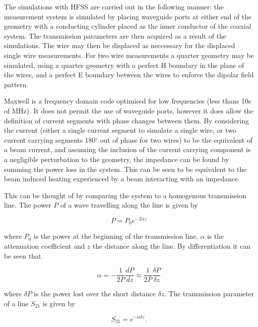 The simulations with HFSS are carried out in the following manner: the measurement system is simulated by placing waveguide ports at either end of the geometry with a conducting cylinder placed as the inner conductor of the coaxial system. The transmission parameters are then acquired as a result of the simulations. The wire may then be displaced as neccessary for the displaced single wire measurements. For two wire measurements a quarter geometry may be simulated, using a quarter geometry with a perfect H boundary in the plane of the wires, and a perfect E boundary between the wires to enforce the dipolar field pattern.

Maxwell is a frequency domain code optimised for low frequencies (less thans 10s of MHz). It does not permit the use of waveguide ports, however it does allow the definition of current segments with phase changes between them. By considering the current (either a single current segment to simulate a single wire, or two current carrying segments 180$^{\circ}$ out of phase for two wires) to be the equivalent of a beam current, and assuming the inclusion of the current carrying component is a negligible perturbation to the geometry, the impedance can be found by summing the power loss in the system. This can be seen to be equivalent to the beam induced heating experienced by a beam interacting with an impedance.

This can be thought of by comparing the system to a homogenous transmission line. The power $P$ of a wave travelling along the line is given by \cite{Kroyer:lowFreqColImp}

\begin{equation}
P = P_{0}e^{-2\alpha z}
\end{equation}

where $P_{0}$ is the power at the beginning of the transmission line, $\alpha$ is the attenuation coefficient and $z$ the distance along the line. By differentiation it can be seen that

\begin{equation}
\alpha = -\frac{1}{2P} \frac{dP}{dz} \approx \frac{1}{2P} \frac{\delta P}{\delta z}
\end{equation}

where $\delta P$ is the power lost over the short distance $\delta z$. The transmission parameter of a line $S_{21}$ is given by

\begin{equation}
S_{21} = e^{-\alpha \delta z}.
\end{equation}

